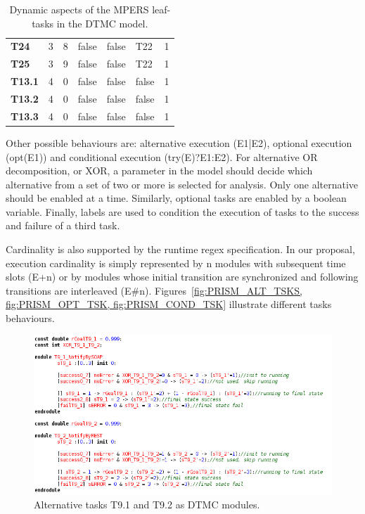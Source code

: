 \begin{table}[h]
{\begin{tabularx}{\textwidth}{@{}lllllll@{}}
\textbf{T24}   & 3                  & 8                  & false             & false                & T22                  & 1           \\
\textbf{T25}   & 3                  & 9                  & false             & false                & T22                  & 1           \\
\textbf{T13.1} & 4                  & 0                  & false             & false                & false                & 1           \\
\textbf{T13.2} & 4                  & 0                  & false             & false                & false                & 1           \\
\textbf{T13.3} & 4                  & 0                  & false             & false                & false                & 1           \\ \bottomrule
\end{tabularx}
\caption{Dynamic aspects of the MPERS leaf-tasks in the DTMC model.}
}
\end{table}

Other possible behaviours are: alternative execution (E1|E2), optional execution (opt(E1)) and conditional execution (try(E)?E1:E2). For alternative OR decomposition, or XOR, a parameter in the model should decide which alternative from a set of two or more is selected for analysis. Only one alternative should be enabled at a time. Similarly, optional tasks are enabled by a boolean variable. Finally, labels are used to condition the execution of tasks to the success and failure of a third task. 

Cardinality is also supported by the runtime regex specification. In our proposal, execution cardinality is simply represented by n modules with subsequent time slots (E+n) or by modules whose initial transition are synchronized and following transitions are interleaved (E\#n). Figures~\ref{fig:PRISM_ALT_TSKS, fig:PRISM_OPT_TSK, fig:PRISM_COND_TSK} illustrate different tasks behaviours.

\begin{figure}[ht]
\centering
\includegraphics[width=1\textwidth]{imgs/PRISM_ALT_TSKS.png}
\caption{Alternative tasks T9.1 and T9.2 as DTMC modules.}
\label{fig:PRISM_ALT_TSKS}
\end{figure}

